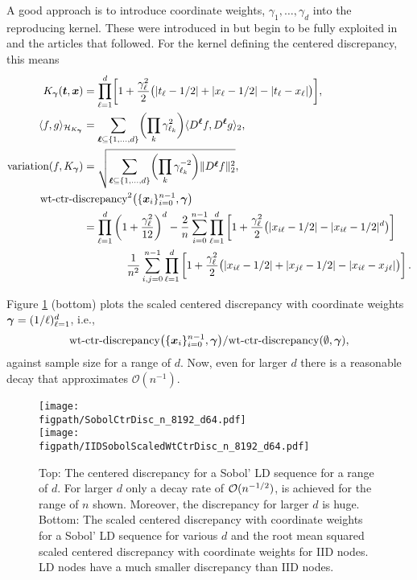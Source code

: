 \documentclass{svproc}
\newcommand{\figpath}{Figures}
\begin{document}
A good approach is to introduce coordinate weights, $\gamma_1, \ldots, \gamma_d$ into the reproducing kernel.  These were introduced in \cite{Hic95} but begin to be fully exploited in \cite{SloWoz98} and the articles that followed.  For the kernel defining the centered discrepancy, this means
\begin{align} \label{eq:wtctrkernel}
	K_{\bsgamma}(\bst,\bsx) &= \prod_{\ell = 1}^d \biggl [ 1 + \frac {\gamma_\ell^2}2 \bigl ( \lvert t_\ell - 1/2 \rvert + \lvert x_\ell - 1/2 \rvert - \lvert t_\ell - x_\ell \rvert \bigr ) \biggr] , \\
	\langle f, g \rangle_{\calH_{K_{\bsgamma}}}  &= \sum_{\bsell \subseteq \{1, \ldots, d\}} \biggl(\prod_k \gamma_{\ell_k}^2 \biggr) \langle D^{\bsell}f, D^{\bsell}g \rangle_2, \\
    \label{eq:wtctrvariation}
	\text{variation}(f,K_{\bsgamma})  &= \sqrt{\sum_{\bsell \subseteq \{1, \ldots, d\}} \biggl( \prod_k \gamma_{\ell_k}^{-2} \biggr) \lVert D^{\bsell}f \rVert_2^2}, \\
	\label{eq:wt-ctrdisc}
	\nonumber
	\MoveEqLeft[4]\text{wt-ctr-discrepancy}^2\bigl(\{ \bsx_i\}_{i=0}^{n-1} , \bsgamma\bigr) \\
	\nonumber
	&= \prod_{\ell=1}^d \left ( 1 + \frac{\gamma_{\ell}^2}{12} \right )^d
	- \frac 2n \sum_{i=0}^{n-1} \prod_{\ell=1}^d \left [ 1 + \frac {\gamma_{\ell}^2}2 \bigl ( \lvert x_{i\ell} - 1/2 \rvert - \lvert x_{i\ell} - 1/2 \rvert^d \bigr )\right ] \\
	& \qquad \qquad \frac{1}{n^2} \sum_{i,j=0}^{n-1} \prod_{\ell = 1}^d \left[ 1 + \frac {\gamma_{\ell}^2}2 \bigl ( \lvert x_{i\ell} - 1/2 \rvert + \lvert x_{j\ell} - 1/2 \rvert - \lvert x_{i\ell} - x_{j\ell} \rvert \bigr ) \right].
\end{align}

Figure \ref{fig:scaledweightedcentered} (bottom) plots the scaled centered discrepancy with coordinate weights ${\boldsymbol{\gamma}} = (1/\ell)_{\ell =1}^d$, i.e., 
\begin{equation*}
    \text{wt-ctr-discrepancy}\bigl(\{ {\boldsymbol{x}}_i\}_{i=0}^{n-1},{\boldsymbol{\gamma}} \bigr)/\text{wt-ctr-discrepancy}(\emptyset,{\boldsymbol{\gamma}} ),
\end{equation*}
against sample size for a range of $d$.  Now, even for larger $d$ there is a reasonable decay that approximates $\mathcal{O}(n^{-1})$.

\begin{figure}[!ht]
    \centering
    \texttt{[image: \\figpath/SobolCtrDisc\_n\_8192\_d64.pdf]} \\
    \texttt{[image: \\figpath/IIDSobolScaledWtCtrDisc\_n\_8192\_d64.pdf]}
    \caption{Top: The centered discrepancy for a Sobol' LD sequence for a range of $d$.  For larger $d$ only a decay rate of ${\mathcal{O}}(n^{-1/2})$, is achieved for the range of $n$ shown.  Moreover, the discrepancy for larger $d$ is huge.
    Bottom:
    The scaled centered discrepancy with coordinate weights for a Sobol' LD sequence for various $d$ and the root mean squared scaled centered discrepancy with coordinate weights for IID nodes.  LD nodes have a much smaller discrepancy than IID nodes.}
    \label{fig:scaledweightedcentered}
\end{figure}
\end{document}

